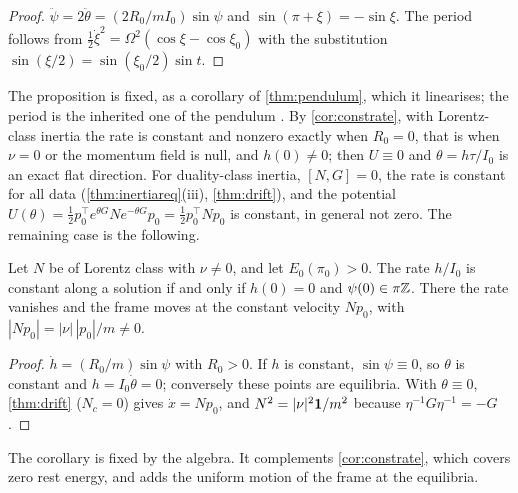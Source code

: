 \begin{proof}
$\ddot\psi=2\ddot\theta=(2R_0/mI_0)\sin\psi$ and $\sin(\pi+\xi)=-\sin\xi$. The period follows from $\tfrac12\dot\xi^2=\Omega^2(\cos\xi-\cos\xi_0)$ with
the substitution $\sin(\xi/2)=\sin(\xi_0/2)\sin t$.
\end{proof}

The proposition is fixed, as a corollary of \cref{thm:pendulum}, which it linearises; the period is the inherited one of the pendulum
\cite{DLMF}. By \cref{cor:constrate}, with Lorentz-class inertia the rate is constant and nonzero exactly when $R_0=0$, that is when $\nu=0$ or
the momentum field is null, and $h(0)\neq0$; then $U\equiv0$ and $\theta=h\tau/I_0$ is an exact flat direction. For duality-class inertia, $[N,G]=0$, the rate is constant for all data
(\cref{thm:inertiareq}(iii), \cref{thm:drift}), and the potential $U(\theta)=\tfrac12p_0^{\!\top}e^{\theta G}Ne^{-\theta G}p_0=\tfrac12p_0^{\!\top}Np_0$ is
constant, in general not zero. The remaining case is the following.

\begin{corollary}
\label{cl:flat}
Let $N$ be of Lorentz class with $\nu\neq0$, and let $E_0(\pi_0)>0$. The rate $h/I_0$ is constant along a solution if and only if $h(0)=0$ and
$\psi(0)\in\pi\mathbb{Z}$. There the rate vanishes and the frame moves at the constant velocity $Np_0$, with $|Np_0|=|\nu|\,|p_0|/m\neq0$.
\end{corollary}

\begin{proof}
$\dot h=(R_0/m)\sin\psi$ with $R_0>0$. If $h$ is constant, $\sin\psi\equiv0$, so $\theta$ is constant and $h=I_0\dot\theta=0$; conversely these points are
equilibria. With $\theta\equiv0$, \cref{thm:drift} ($N_c=0$) gives $\dot x=Np_0$, and $N^2=|\nu|^2\mathbf 1/m^2$ because $\eta^{-1}G\eta^{-1}=-G$.
\end{proof}

The corollary is fixed by the algebra. It complements \cref{cor:constrate}, which covers zero rest energy, and adds the uniform motion of the frame
at the equilibria.

